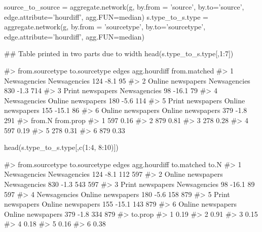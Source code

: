 \begin{Schunk}
\begin{Sinput}
source_to_source = aggregate.network(g, by.from = 'source', by.to='source', 
                                     edge.attribute='hourdiff', agg.FUN=median)
s.type_to_s.type = aggregate.network(g, by.from = 'sourcetype', by.to='sourcetype', 
                                     edge.attribute='hourdiff', agg.FUN=median)

## Table printed in two parts due to width
head(s.type_to_s.type[,1:7])
\end{Sinput}
\begin{Soutput}
#>     from.sourcetype     to.sourcetype edges agg.hourdiff from.matched
#> 1      Newsagencies      Newsagencies   124         -8.1           95
#> 2 Online newspapers      Newsagencies   830         -1.3          714
#> 3  Print newspapers      Newsagencies    98        -16.1           79
#> 4      Newsagencies Online newspapers   180         -5.6          114
#> 5  Print newspapers Online newspapers   155        -15.1           86
#> 6 Online newspapers Online newspapers   379         -1.8          291
#>   from.N from.prop
#> 1    597      0.16
#> 2    879      0.81
#> 3    278      0.28
#> 4    597      0.19
#> 5    278      0.31
#> 6    879      0.33
\end{Soutput}
\begin{Sinput}
head(s.type_to_s.type[,c(1:4, 8:10)])
\end{Sinput}
\begin{Soutput}
#>     from.sourcetype     to.sourcetype edges agg.hourdiff to.matched to.N
#> 1      Newsagencies      Newsagencies   124         -8.1        112  597
#> 2 Online newspapers      Newsagencies   830         -1.3        543  597
#> 3  Print newspapers      Newsagencies    98        -16.1         89  597
#> 4      Newsagencies Online newspapers   180         -5.6        158  879
#> 5  Print newspapers Online newspapers   155        -15.1        143  879
#> 6 Online newspapers Online newspapers   379         -1.8        334  879
#>   to.prop
#> 1    0.19
#> 2    0.91
#> 3    0.15
#> 4    0.18
#> 5    0.16
#> 6    0.38
\end{Soutput}
\end{Schunk}

